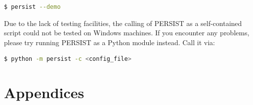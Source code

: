 \documentclass[
	a4paper, %
	12pt, %
]{persist}
\begin{document}
\begin{lstlisting}[language=bash]
	$ persist --demo
\end{lstlisting}

\begin{note}
	Due to the lack of testing facilities, the calling of PERSIST as a self-contained script could not be tested on Windows machines. If you encounter any problems, please try running PERSIST as a Python module instead. Call it via:
	\begin{lstlisting}[language=bash]
	$ python -m persist -c <config_file>
	\end{lstlisting}
\end{note}


\newpage


\begin{twothirdswidth} %
	\printbibliography[title=Reference List] %
\end{twothirdswidth}


\newpage

\section*{Appendices}
\end{document}
